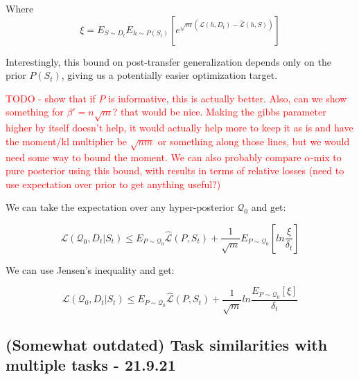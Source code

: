 \documentclass[letterpaper]{article}
\theoremstyle{definition}
\begin{document}
Where $$\xi=E_{S\sim D_t}E_{h\sim P(S_t)}\left [e^{\sqrt{m}(\mathcal{L}(h, D_t)-\hat{\mathcal{L}}(h, S))} \right ]$$

Interestingly, this bound on post-transfer generalization depends only on the prior $P(S_t)$, giving us a potentially easier optimization target.

\textcolor{red}{TODO - show that if $P$ is informative, this is actually better. Also, can we show something for $\beta'=n\sqrt{m}$? that would be nice. Making the gibbs parameter higher by itself doesn't help, it would actually help more to keep it as is and have the moment/kl multiplier be $\sqrt{nm}$ or something along those lines, but we would need some way to bound the moment.
	We can also probably compare $\alpha$-mix to pure posterior using this bound, with results in terms of relative losses (need to use expectation over prior to get anything useful?)}

We can take the expectation over any hyper-posterior $\mathcal{Q}_0$ and get:

$$\mathcal{L}(\mathcal{Q}_0, D_t|S_t) \leq E_{P\sim \mathcal{Q}_0}\hat{\mathcal{L}}(P, S_t) + \frac{1}{\sqrt{m}}E_{P\sim \mathcal{Q}_0}\left [ln\frac{\xi}{\delta_t}\right ]$$

We can use Jensen's inequality and get:

$$\mathcal{L}(\mathcal{Q}_0, D_t|S_t) \leq E_{P\sim \mathcal{Q}_0}\hat{\mathcal{L}}(P, S_t) + \frac{1}{\sqrt{m}}ln\frac{E_{P\sim \mathcal{Q}_0}\left [\xi\right ]}{\delta_t}$$

\subsection{(Somewhat outdated) Task similarities with multiple tasks - 21.9.21}
\end{document}
